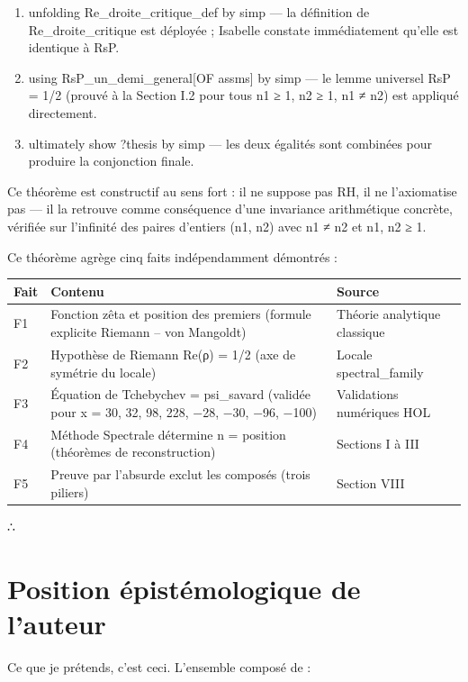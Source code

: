 \documentclass[11pt,a4paper]{article}
\begin{document}
\begin{enumerate}[leftmargin=*]
\item unfolding Re\_droite\_critique\_def by simp — la définition de Re\_droite\_critique est déployée ; Isabelle constate immédiatement qu'elle est identique à RsP.
\item using RsP\_un\_demi\_general[OF assms] by simp — le lemme universel RsP = 1/2 (prouvé à la Section I.2 pour tous n1 ≥ 1, n2 ≥ 1, n1 ≠ n2) est appliqué directement.
\item ultimately show ?thesis by simp — les deux égalités sont combinées pour produire la conjonction finale.
\end{enumerate}
Ce théorème est constructif au sens fort : il ne suppose pas RH, il ne l'axiomatise pas — il la retrouve comme conséquence d'une invariance arithmétique concrète, vérifiée sur l'infinité des paires d'entiers (n1, n2) avec n1 ≠ n2 et n1, n2 ≥ 1.

Ce théorème agrège cinq faits indépendamment démontrés :


\begin{longtable}{|p{}|p{}|p{}|}
\hline
Fait & Contenu & Source \\
\hline
F1 & Fonction zêta et position des premiers (formule explicite Riemann – von Mangoldt) & Théorie analytique classique \\
\hline
F2 & Hypothèse de Riemann Re(ρ) = 1/2 (axe de symétrie du locale) & Locale spectral\_family \\
\hline
F3 & Équation de Tchebychev = psi\_savard (validée pour x = 30, 32, 98, 228, −28, −30, −96, −100) & Validations numériques HOL \\
\hline
F4 & Méthode Spectrale détermine n = position (théorèmes de reconstruction) & Sections I à III \\
\hline
F5 & Preuve par l'absurde exclut les composés (trois piliers) & Section VIII \\
\hline
\end{longtable}


∴

\section{Position épistémologique de l'auteur}
Ce que je prétends, c'est ceci. L'ensemble composé de :
\end{document}
